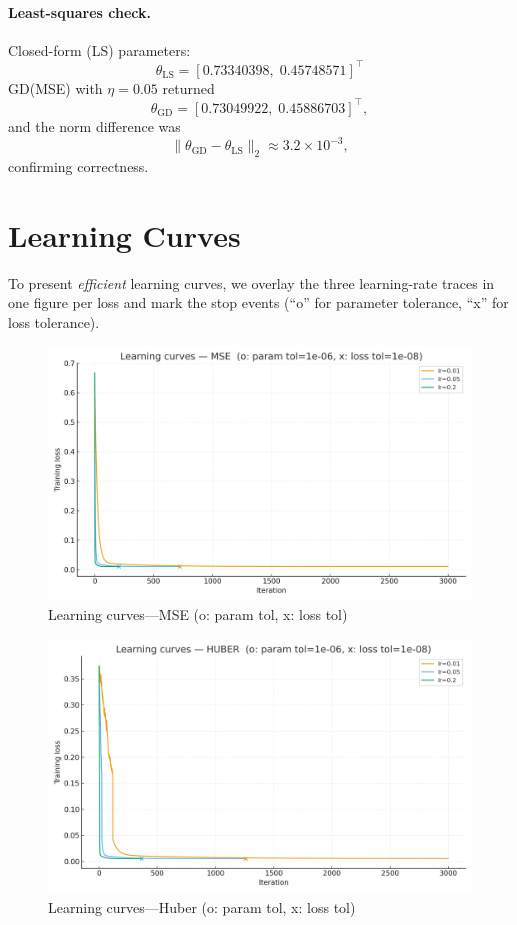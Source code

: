 \documentclass[11pt]{article}
\begin{document}
\paragraph{Least-squares check.}
Closed-form (LS) parameters:
\[
\theta_{\mathrm{LS}} = [0.73340398,\; 0.45748571]^\top
\]
GD(MSE) with $\eta=0.05$ returned
\[
\theta_{\mathrm{GD}} = [0.73049922,\; 0.45886703]^\top,
\]
and the norm difference was
\[
\|\theta_{\mathrm{GD}}-\theta_{\mathrm{LS}}\|_2 \approx 3.2\times10^{-3},
\]
confirming correctness.

\section{Learning Curves}
To present \emph{efficient} learning curves, we overlay the three learning-rate traces in one figure per loss and mark the stop events (``o'' for parameter tolerance, ``x'' for loss tolerance).

\begin{figure}[H]
\centering
\includegraphics[width=0.9\linewidth]{mse_learning_curves.png}
\caption{Learning curves---MSE \; (o: param tol, x: loss tol)}
\label{fig:mse}
\end{figure}

\begin{figure}[H]
\centering
\includegraphics[width=0.9\linewidth]{huber_learning_curves.png}
\caption{Learning curves---Huber \; (o: param tol, x: loss tol)}
\label{fig:huber}
\end{figure}
\end{document}

